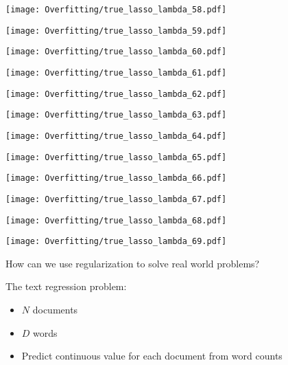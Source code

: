 \documentclass[xcolor=pdftex,dvipsnames,table]{beamer}
\begin{document}
\frame
{
	\begin{center}
		\texttt{[image: Overfitting/true\_lasso\_lambda\_58.pdf]}
	\end{center}
}
\frame
{
	\begin{center}
		\texttt{[image: Overfitting/true\_lasso\_lambda\_59.pdf]}
	\end{center}
}
\frame
{
	\begin{center}
		\texttt{[image: Overfitting/true\_lasso\_lambda\_60.pdf]}
	\end{center}
}
\frame
{
	\begin{center}
		\texttt{[image: Overfitting/true\_lasso\_lambda\_61.pdf]}
	\end{center}
}
\frame
{
	\begin{center}
		\texttt{[image: Overfitting/true\_lasso\_lambda\_62.pdf]}
	\end{center}
}
\frame
{
	\begin{center}
		\texttt{[image: Overfitting/true\_lasso\_lambda\_63.pdf]}
	\end{center}
}
\frame
{
	\begin{center}
		\texttt{[image: Overfitting/true\_lasso\_lambda\_64.pdf]}
	\end{center}
}
\frame
{
	\begin{center}
		\texttt{[image: Overfitting/true\_lasso\_lambda\_65.pdf]}
	\end{center}
}
\frame
{
	\begin{center}
		\texttt{[image: Overfitting/true\_lasso\_lambda\_66.pdf]}
	\end{center}
}
\frame
{
	\begin{center}
		\texttt{[image: Overfitting/true\_lasso\_lambda\_67.pdf]}
	\end{center}
}
\frame
{
	\begin{center}
		\texttt{[image: Overfitting/true\_lasso\_lambda\_68.pdf]}
	\end{center}
}
\frame
{
	\begin{center}
		\texttt{[image: Overfitting/true\_lasso\_lambda\_69.pdf]}
	\end{center}
}

\frame
{
	How can we use regularization to solve real world problems?
}

\frame
{
	The text regression problem:
	\begin{itemize}
		\item{$N$ documents}
		\item{$D$ words}
		\item{Predict continuous value for each document from word counts}
	\end{itemize}
}
\end{document}
